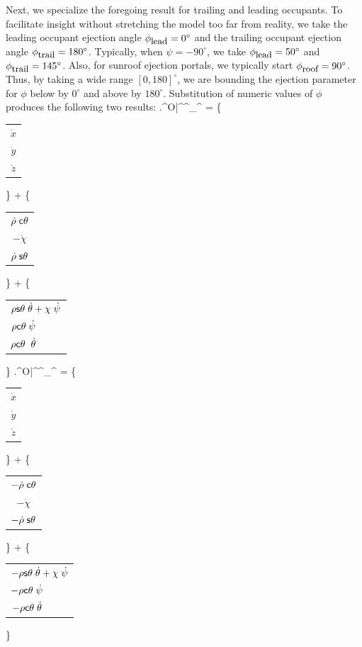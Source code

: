 \documentclass[10pt,legalpaper,twocolumn,reqno]{amsart}
\begin{document}
Next, we specialize the foregoing result for trailing and leading occupants.
To facilitate insight without stretching the model too far from 
reality, we take 
the leading occupant ejection angle 
$\phi_{\mbox{\small lead}} = 0^{\circ}$
and 
the trailing occupant ejection angle 
$\phi_{\mbox{\small trail}} = 180^{\circ}$.
Typically, when $\psi = -90^{\circ}$, 
we take 
$\phi_{\mbox{\small lead}} = 50^{\circ}$ and 
$\phi_{\mbox{\small trail}} = 145^{\circ}$.
Also, for sunroof ejection portals, we typically start
$\phi_{\mbox{\small roof}} = 90^{\circ}$.  
Thus, by taking a wide range $[0, 180]^{\circ}$, we are 
bounding the ejection parameter for $\phi$ 
below by $0^{\circ}$
and
above by $180^{\circ}$. 
Substitution of numeric values of $\phi$ produces the following two
results:
\be
\left.\vv^{O}\right|^{^{\circ}}_{^{\circ}} 
= 
\left\{  
	\begin{tabular}{c}
 	  	$\dot{x}$ \\ 
 		$\dot{y}$ \\ 
 		$\dot{z}$
 	\end{tabular}
\right\}
+
\left\{  
	\begin{tabular}{c}
 	  	$\dot{\rho} \; \hcos \theta$ \\ 
 		$-\dot{\chi}$ \\ 
 		$\dot{\rho} \; \hsin \theta$
 	\end{tabular}
\right\}
+
\left\{  
	\begin{tabular}{c}
 	  	$\rho \hsin \theta \; 
			\dot{\theta} + \chi \; \dot{\psi}$ \\ 
 		$\rho \hcos \theta \; 
			\dot{\psi} \;\;\;\;\;\;\;\; \;$ \\ 
 		$\rho \hcos \theta \; \; 
			\dot{\theta} \;\;\;\;\;\;\;\; \;$
 	\end{tabular}
\right\}
\ee
\be
\left.\vv^{O}\right|^{^{\circ}}_{^{\circ}} 
= 
\left\{  
	\begin{tabular}{c}
 	  	$\dot{x}$ \\ 
 		$\dot{y}$ \\ 
 		$\dot{z}$
 	\end{tabular}
\right\}
+
\left\{  
	\begin{tabular}{c}
 	  	$-\dot{\rho} \; \hcos \theta$ \\ 
 		$-\dot{\chi}$ \\ 
 		$-\dot{\rho} \; \hsin \theta$
 	\end{tabular}
\right\}
+
\left\{  
	\begin{tabular}{c}
 	  	$-\rho \hsin \theta \; 
			\dot{\theta} + \chi \; \dot{\psi}$ \\ 
 		$-\rho \hcos \theta \; 
			\dot{\psi} \;\;\;\;\;\;\;\; \;$ \\ 
 		$-\rho \hcos \theta \; 
			\dot{\theta} \;\;\;\;\;\;\;\; \;$
 	\end{tabular}
\right\}
\ee
\end{document}

